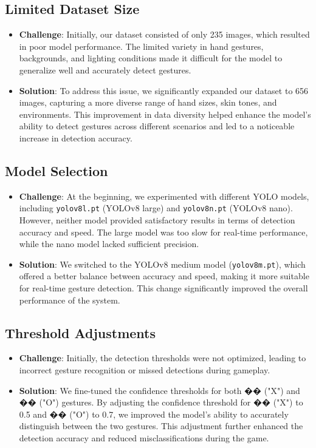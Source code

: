 \documentclass[a4paper,12pt]{article}
\begin{document}
\subsection{Limited Dataset Size}
\begin{itemize}
    \item \textbf{Challenge}: Initially, our dataset consisted of only 235 images, which resulted in poor model performance. The limited variety in hand gestures, backgrounds, and lighting conditions made it difficult for the model to generalize well and accurately detect gestures.
    \item \textbf{Solution}: To address this issue, we significantly expanded our dataset to 656 images, capturing a more diverse range of hand sizes, skin tones, and environments. This improvement in data diversity helped enhance the model’s ability to detect gestures across different scenarios and led to a noticeable increase in detection accuracy.
\end{itemize}

\subsection{Model Selection}
\begin{itemize}
    \item \textbf{Challenge}: At the beginning, we experimented with different YOLO models, including \texttt{yolov8l.pt} (YOLOv8 large) and \texttt{yolov8n.pt} (YOLOv8 nano). However, neither model provided satisfactory results in terms of detection accuracy and speed. The large model was too slow for real-time performance, while the nano model lacked sufficient precision.
    \item \textbf{Solution}: We switched to the YOLOv8 medium model (\texttt{yolov8m.pt}), which offered a better balance between accuracy and speed, making it more suitable for real-time gesture detection. This change significantly improved the overall performance of the system.
\end{itemize}

\subsection{Threshold Adjustments}
\begin{itemize}
    \item \textbf{Challenge}: Initially, the detection thresholds were not optimized, leading to incorrect gesture recognition or missed detections during gameplay.
    \item \textbf{Solution}: We fine-tuned the confidence thresholds for both �� ("X") and �� ("O") gestures. By adjusting the confidence threshold for �� ("X") to 0.5 and �� ("O") to 0.7, we improved the model’s ability to accurately distinguish between the two gestures. This adjustment further enhanced the detection accuracy and reduced misclassifications during the game.
\end{itemize}
\end{document}
